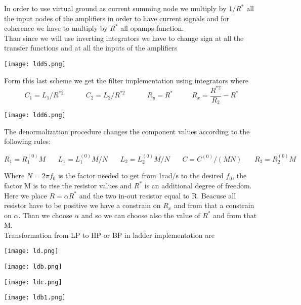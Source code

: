 In order to use virtual ground as current summing node we multiply by $1/R^*$ all the input nodes of the amplifiers in order to have current signals and for coherence we have to multiply by $R^*$ all opamps function.\\
Than since we will use inverting integrators we have to change sign at all the transfer functions and at all the inputs of the amplifiers

\centering
\texttt{[image: ldd5.png]}\\
\raggedright

Form this last scheme we get the filter implementation using integrators where 
\begin{equation}
C_1=L_1/R^{*2} \ \ \ \ \ \ \ \ \ \ \ \ \ \ C_2=L_2/R^{*2}  \ \ \ \ \ \ \ \ \ \ \ \ \ \ R_y=R^* \ \ \ \ \ \ \ \ \ \ \ \ R_x=\frac{R^{*2}}{R_2}-R^*
\end{equation}


\centering
\texttt{[image: ldd6.png]}\\
\raggedright


The denormalization procedure changes the component values according to the following rules:

\begin{equation}
R_1=R_1^{(0)}M \ \ \ \ \ \ \ \ L_1=L_1^{(0)}M/N \ \ \ \ \ \ \ \ L_2=L_2^{(0)}M/N \ \ \ \ \ \ \ \ C=C^{(0)}/(MN) \ \ \ \ \ \ \ \ R_2=R_2^{(0)}M
\end{equation}

Where $N=2\pi f_0$ is the factor needed to get from 1rad/s to the desired $f_0$, the factor M is to rise the resistor values and $R^*$ is an additional degree of freedom.\\
Here we place $R=\alpha R^*$ and the two in-out resistor equal to R. Beacuse all resistor have to be positive we have a constrain on $R_x$ and from that a constrain on $\alpha$. Than we choose $\alpha $ and so we can choose also the value of $R^*$ and from that M.\\
\vspace{5mm}
Transformation from LP to HP or BP in ladder implementation are 

\centering
\texttt{[image: ld.png]}\\
\raggedright


\centering
\texttt{[image: ldb.png]}\\
\raggedright


\centering
\texttt{[image: ldc.png]}\\
\raggedright

\centering
\texttt{[image: ldb1.png]}\\
\raggedright

